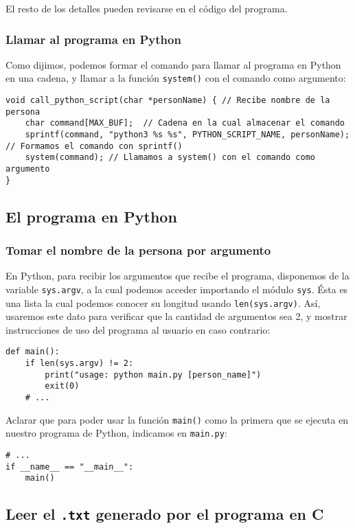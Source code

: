\documentclass[a4paper]{article}
\begin{document}
El resto de los detalles pueden revisarse en el código del programa.

\subsubsection{Llamar al programa en Python}

Como dijimos, podemos formar el comando para llamar al programa en Python en una cadena, y llamar a la función \texttt{system()} con el comando como argumento:

\begin{verbatim}
void call_python_script(char *personName) { // Recibe nombre de la persona
    char command[MAX_BUF];  // Cadena en la cual almacenar el comando
    sprintf(command, "python3 %s %s", PYTHON_SCRIPT_NAME, personName); // Formamos el comando con sprintf()
    system(command); // Llamamos a system() con el comando como argumento
}
\end{verbatim}

\subsection{El programa en Python}

\subsubsection{Tomar el nombre de la persona por argumento}

En Python, para recibir los argumentos que recibe el programa, disponemos de la variable \texttt{sys.argv}, a la cual podemos acceder importando el módulo \texttt{sys}. Ésta es una lista la cual podemos conocer su longitud usando \texttt{len(sys.argv)}. Así, usaremos este dato para verificar que la cantidad de argumentos sea 2, y mostrar instrucciones de uso del programa al usuario en caso contrario:
\begin{verbatim}
def main():
    if len(sys.argv) != 2:
        print("usage: python main.py [person_name]")
        exit(0)
    # ...
\end{verbatim}
Aclarar que para poder usar la función \texttt{main()} como la primera que se ejecuta en nuestro programa de Python, indicamos en \texttt{main.py}:
\begin{verbatim}
# ...
if __name__ == "__main__":
    main()
\end{verbatim}

\subsection{Leer el \texttt{.txt} generado por el programa en C}
\end{document}
